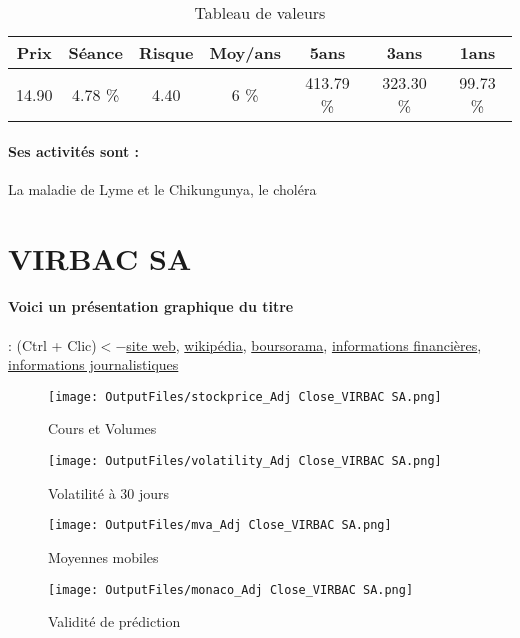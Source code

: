 \documentclass[11pt,a4paper]{report}%
\begin{document}
\begin{table}[H]
  \centering
    \begin{tabular}{|c|c|c|c|c|c|c|}
    \hline
    Prix & Séance & Risque  & Moy/ans & 5ans & 3ans & 1ans \\
    \hline
    14.90 &    4.78 \%    & 4.40 & 6 \% & 413.79 \% & 323.30 \% & 99.73 \% \\
    \hline
    \end{tabular}%
        \label{tab:table_VALNEVA SE}%
      \caption{Tableau de valeurs}
\end{table}%

\paragraph{Ses activités sont : } La maladie de Lyme et le Chikungunya, le choléra 
    
    \newpage

\section{VIRBAC SA}

\paragraph{Voici un présentation graphique du titre} : (Ctrl + Clic)$<-$\href{https://fr.virbac.com/}{site web}, \href{https://fr.wikipedia.org/wiki/Virbac}{wikipédia}, \href{https://www.boursorama.com/cours/1rPVIRP}{boursorama}, \href{https://www.qwant.com/?q=site:https:%2f%2fwww.easybourse.com%2faction-societe%2fVIRBAC-SA&t=web&client=ext-firefox-hp}{informations financières}, \href{https://bourse.lerevenu.com/cours-de-bourse/fiche-valeur-synthese/VIRBAC-SA/VIRP-FR}{informations journalistiques}
\begin{figure}[!htb]
   \begin{minipage}{0.5\textwidth}
     \centering
     \texttt{[image: OutputFiles/stockprice\_Adj Close\_VIRBAC SA.png]}
     \caption{Cours et Volumes}\label{Fig:price_VIRBAC SA}
   \end{minipage}\hfill
   \begin{minipage}{0.5\textwidth}
     \centering
     \texttt{[image: OutputFiles/volatility\_Adj Close\_VIRBAC SA.png]}
     \caption{Volatilité à 30 jours}\label{Fig:volat_VIRBAC SA}
   \end{minipage}
\end{figure}
\begin{figure}[!htb]
   \begin{minipage}{0.5\textwidth}
     \centering
     \texttt{[image: OutputFiles/mva\_Adj Close\_VIRBAC SA.png]}
     \caption{Moyennes mobiles}\label{Fig:mva_VIRBAC SA}
   \end{minipage}\hfill
   \begin{minipage}{0.5\textwidth}
     \centering
     \texttt{[image: OutputFiles/monaco\_Adj Close\_VIRBAC SA.png]}
     \caption{Validité de prédiction}\label{Fig:prediction_VIRBAC SA}
   \end{minipage}
\end{figure}
\end{document}
